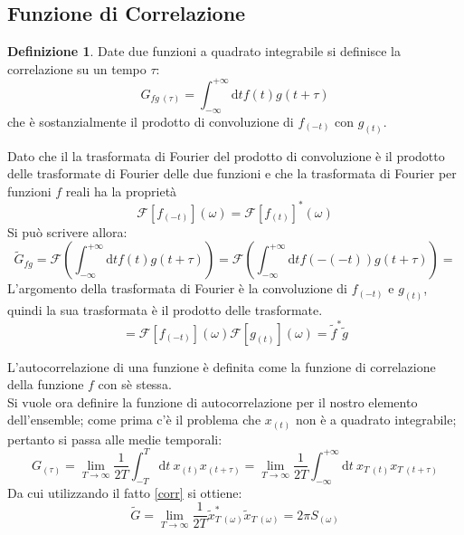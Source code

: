 \documentclass[a4paper,12pt]{article}
\renewcommand{\arg}[1]{_{(#1)}}
\theoremstyle{plain}
\theoremstyle{definition}
\newtheorem{defn}{Definizione}[section]
\renewcommand{\d}{\text{d}}
\theoremstyle{remark}
\begin{document}
\subsection{Funzione di Correlazione}
\begin{defn}
	Date due funzioni a quadrato integrabile si definisce la correlazione su un tempo $\tau$:
	\[G_{fg\:(\tau)}=\int_{-\infty}^{+\infty} \d t f(t)	g(t+\tau)\]
	che è sostanzialmente  il prodotto di convoluzione di $f\arg{-t}$ con $g\arg{t}$.
\end{defn} 
Dato che il la trasformata di Fourier del prodotto di convoluzione è il prodotto delle trasformate di Fourier delle due funzioni e che la trasformata di Fourier per funzioni $f$ reali ha la proprietà \[\mathcal{F}[f\arg{-t}](\omega)=\mathcal{F}[f\arg{t}]^*(\omega)\]
Si può scrivere allora:
\begin{equation}
\tilde{G}_{fg}=\mathcal{F}\left(\int_{-\infty}^{+\infty} \d t f(t)	g(t+\tau)\right)=\mathcal{F}\left(\int_{-\infty}^{+\infty} \d t f(-(-t))	g(t+\tau)\right)=
\end{equation}
L'argomento della trasformata di Fourier è la convoluzione di $f\arg{-t}$ e $g\arg{t}$, quindi la sua trasformata è il prodotto delle trasformate.
\begin{equation}
=\mathcal{F}[f\arg{-t}](\omega)\mathcal{F}[g\arg{t}](\omega)	=\tilde{f}^* \tilde{g}\label{corr}
\end{equation}

L'autocorrelazione di una funzione è definita come la funzione di correlazione della funzione $f$ con sè stessa.\\
Si vuole ora definire la funzione di autocorrelazione per il nostro elemento dell'ensemble; come prima c'è il problema che $x\arg{t}$ non è a quadrato integrabile; pertanto si passa alle medie temporali:
\[G\arg{\tau}=\lim_{T\rightarrow\infty}\frac{1}{2T}\int_{-T}^{T} \d t\: x\arg{t}x\arg{t+\tau}=\lim_{T\rightarrow\infty}\frac{1}{2T}\int_{-\infty}^{+\infty} \d t\: x_{T\:(t)}x_{T\:(t+\tau)}\]
Da cui utilizzando il fatto \ref{corr} si ottiene:
\[{\tilde{G}}=\lim_{T\rightarrow\infty}\frac{1}{2T} \tilde{x}_{T\:(\omega)}^*\tilde{x}_{T\:(\omega)}=2\pi S\arg{\omega}\]
\end{document}
